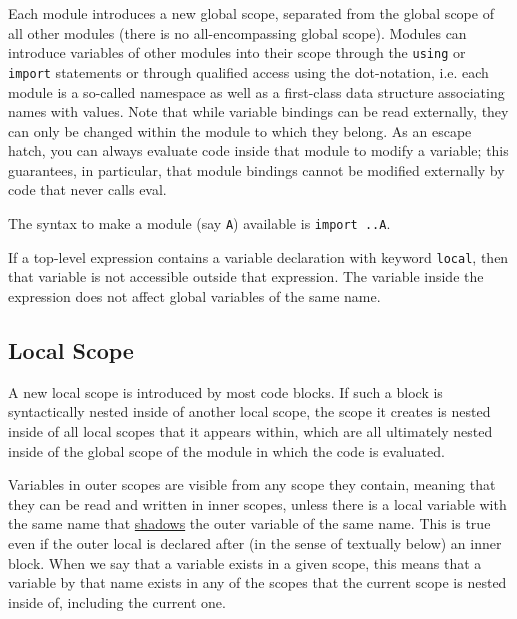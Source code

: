 \documentclass[
]{article}
\begin{document}
Each module introduces a new global scope, separated from the global
scope of all other modules (there is no all-encompassing global scope).
Modules can introduce variables of other modules into their scope
through the \texttt{using} or \texttt{import} statements or through
qualified access using the dot-notation, i.e. each module is a so-called
namespace as well as a first-class data structure associating names with
values. Note that while variable bindings can be read externally, they
can only be changed within the module to which they belong. As an escape
hatch, you can always evaluate code inside that module to modify a
variable; this guarantees, in particular, that module bindings cannot be
modified externally by code that never calls eval.

The syntax to make a module (say \texttt{A}) available is
\texttt{import\ ..A}.

If a top-level expression contains a variable declaration with keyword
\texttt{local}, then that variable is not accessible outside that
expression. The variable inside the expression does not affect global
variables of the same name.

\hypertarget{local-scope}{%
\subsection{Local Scope}\label{local-scope}}

A new local scope is introduced by most code blocks. If such a block is
syntactically nested inside of another local scope, the scope it creates
is nested inside of all local scopes that it appears within, which are
all ultimately nested inside of the global scope of the module in which
the code is evaluated.

Variables in outer scopes are visible from any scope they contain,
meaning that they can be read and written in inner scopes, unless there
is a local variable with the same name that \underline{shadows} the
outer variable of the same name. This is true even if the outer local is
declared after (in the sense of textually below) an inner block. When we
say that a variable exists in a given scope, this means that a variable
by that name exists in any of the scopes that the current scope is
nested inside of, including the current one.
\end{document}
